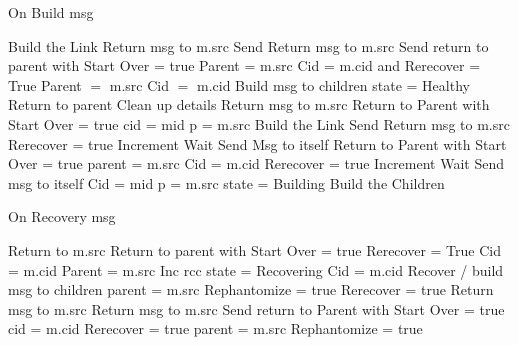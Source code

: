 \documentclass{article}
\begin{document}
	
\begin{algorithm}
\caption{On Build msg}
\label{Build message received}
\begin{multicols}{2}
\begin{algorithmic}[1]
\State Build the Link
	\State Return msg to m.src
		\State Send Return msg to m.src
	\Else
						\State Send return to parent with Start Over = true
		\EndIf
		\State Parent = m.src
		\State Cid = m.cid and Rerecover = True
	\EndIf
{}
	\State Parent $=$ m.src
	\State Cid $=$ m.cid
		\State Build msg to children
	\Else
		\State state = Healthy
		\State Return to parent
		\State Clean up details
	\EndIf
{}
		\State Return msg to m.src
	\Else
			\State Return to Parent with Start Over = true
		\EndIf
		\State cid = mid
		\State p = m.src
		\State Build the Link
	\EndIf
{}
		\State Send Return msg to m.src
		\State Rerecover = true
		\State Increment Wait
		\State Send Msg to itself
	\Else
			\State Return to Parent with Start Over = true
		\EndIf
		\State parent = m.src
		\State Cid = m.cid
		\State Rerecover = true
		\State Increment Wait
		\State Send msg to itself
	\EndIf
{}
	\State Cid = mid
	\State p = m.src
	\State state = Building
	\State Build the Children
\EndIf
\EndProcedure
\end{algorithmic}
\end{multicols}
\end{algorithm}	

\begin{algorithm}
\caption{On Recovery msg}
\label{Recovery message received}
\begin{algorithmic}[1]
	\State Return to m.src
		\State Return to parent with Start Over = true
	\EndIf
	\State Rerecover = True
	\State Cid = m.cid
	\State Parent = m.src
	\State Inc rcc
	\State state = Recovering
	\State Cid = m.cid
	\State Recover / build msg to children
	\State parent = m.src
		\State Rephantomize = true
		\State Rerecover = true
		\State Return msg to m.src
		\State Return msg to m.src
	\Else
			\State Send return to Parent with Start Over = true
		\EndIf
		\State cid = m.cid
		\State Rerecover = true
		\State parent = m.src
		\State Rephantomize = true
	\EndIf
{}
\end{algorithmic}
\end{algorithm}	
\end{document}
